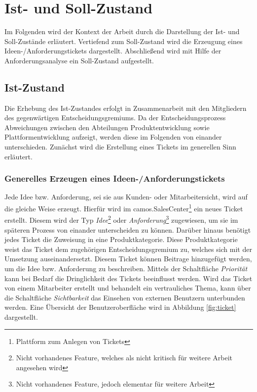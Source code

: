 
\chapter{Ist- und Soll-Zustand}
Im Folgenden wird der Kontext der Arbeit durch die Darstellung der Ist- und Soll-Zustände erläutert. Vertiefend zum Soll-Zustand wird die Erzeugung eines Ideen-/Anforderungstickets dargestellt. Abschließend wird mit Hilfe der Anforderungsanalyse ein Soll-Zustand aufgestellt.

\section{Ist-Zustand}
Die Erhebung des Ist-Zustandes erfolgt in Zusammenarbeit mit den Mitgliedern des gegenwärtigen Entscheidungsgremiums. Da der Entscheidungsprozess Abweichungen zwischen den Abteilungen Produktentwicklung sowie Plattformentwicklung aufzeigt, werden diese im Folgenden von einander unterschieden. Zunächst wird die Erstellung eines Tickets im generellen Sinn erläutert.

\subsection*{Generelles Erzeugen eines Ideen-/Anforderungstickets}
Jede Idee bzw. Anforderung, sei sie aus Kunden- oder Mitarbeitersicht, wird auf die gleiche Weise erzeugt. Hierfür wird im camos.SalesCenter\footnote{Plattform zum Anlegen von Tickets} ein neues Ticket erstellt. Diesem wird der Typ \emph{Idee}\footnote{Nicht vorhandenes Feature, welches als nicht kritisch für weitere Arbeit angesehen wird} oder \emph{Anforderung}\footnote{Nicht vorhandenes Feature, jedoch elementar für weitere Arbeit} zugewiesen, um sie im späteren Prozess von einander unterscheiden zu können. Darüber hinaus benötigt jedes Ticket die Zuweisung in eine Produktkategorie. Diese Produktkategorie weist das Ticket dem zugehörigen Entscheidungsgremium zu, welches sich mit der Umsetzung auseinandersetzt. Diesem Ticket können Beitrage hinzugefügt werden, um die Idee bzw. Anforderung zu beschreiben. Mittels der Schaltfläche \emph{Priorität} kann bei Bedarf die Dringlichkeit des Tickets beeinflusst werden. Wird das Ticket von einem Mitarbeiter erstellt und behandelt ein vertrauliches Thema, kann über die Schaltfläche \emph{Sichtbarkeit} das Einsehen von externen Benutzern unterbunden werden. Eine Übersicht der Benutzeroberfläche wird in Abbildung \ref{fig:ticket} dargestellt.

